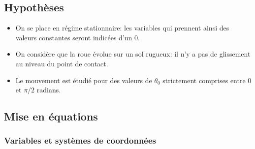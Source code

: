\subsection{Hypothèses}
\begin{itemize}
    \item On se place en régime stationnaire: les variables qui prennent ainsi des valeurs constantes seront indicées d'un 0.
    \item On considère que la roue évolue sur un sol rugueux: il n'y a pas de glissement au niveau du point de contact.
    \item Le mouvement est étudié pour des valeurs de $\theta_0$ strictement comprises entre 0 et $\pi/2$ radians.
\end{itemize}

\subsection{Mise en équations}
\subsubsection{Variables et systèmes de coordonnées}


